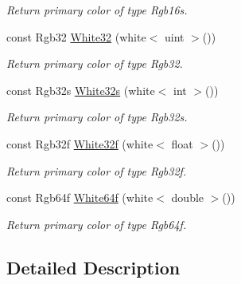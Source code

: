 \begin{DoxyCompactItemize}
\begin{DoxyCompactList}\small\item\em Return primary color of type Rgb16s. \end{DoxyCompactList}\item 
\hypertarget{group___primary_colors_gafd17d721b89d7c07bb7a47e6e37104c2}{const Rgb32 \hyperlink{group___primary_colors_gafd17d721b89d7c07bb7a47e6e37104c2}{White32} (white$<$ uint $>$())}\label{group___primary_colors_gafd17d721b89d7c07bb7a47e6e37104c2}

\begin{DoxyCompactList}\small\item\em Return primary color of type Rgb32. \end{DoxyCompactList}\item 
\hypertarget{group___primary_colors_ga643cc450dd398a08422d6c5be4680956}{const Rgb32s \hyperlink{group___primary_colors_ga643cc450dd398a08422d6c5be4680956}{White32s} (white$<$ int $>$())}\label{group___primary_colors_ga643cc450dd398a08422d6c5be4680956}

\begin{DoxyCompactList}\small\item\em Return primary color of type Rgb32s. \end{DoxyCompactList}\item 
\hypertarget{group___primary_colors_gae7d335f51e9b22c17d909ede91474101}{const Rgb32f \hyperlink{group___primary_colors_gae7d335f51e9b22c17d909ede91474101}{White32f} (white$<$ float $>$())}\label{group___primary_colors_gae7d335f51e9b22c17d909ede91474101}

\begin{DoxyCompactList}\small\item\em Return primary color of type Rgb32f. \end{DoxyCompactList}\item 
\hypertarget{group___primary_colors_ga472f163bd5521fe28f3d2f9a5c68f5cb}{const Rgb64f \hyperlink{group___primary_colors_ga472f163bd5521fe28f3d2f9a5c68f5cb}{White64f} (white$<$ double $>$())}\label{group___primary_colors_ga472f163bd5521fe28f3d2f9a5c68f5cb}

\begin{DoxyCompactList}\small\item\em Return primary color of type Rgb64f. \end{DoxyCompactList}\end{DoxyCompactItemize}


\subsection{Detailed Description}


